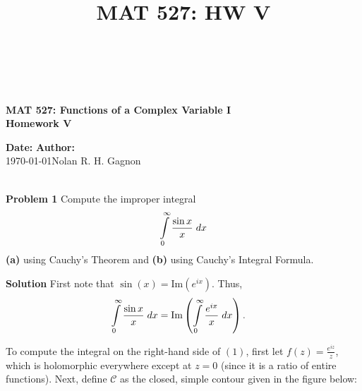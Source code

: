 \documentclass{article}
\title{MAT 527: HW V}
\newcommand{\mybox}{%
    \collectbox{%
        \setlength{\fboxsep}{1pt}%
        \fbox{\BOXCONTENT}%
    }%
}
\begin{document}
\begin{center}
\hrulefill \\
\vspace{-0.7cm}
\hrulefill \\
\vspace{-0.3cm}

\begin{Large}
\textbf{MAT 527:  Functions of a Complex Variable I} \\
\textbf{Homework V} \\
\end{Large}
\begin{large}
\end{large}
\vspace{-7mm}
\noindent \textbf{Date:} \hfill \textbf{Author:}\\
\noindent\today \hfill Nolan R. H. Gagnon \\

\vspace{-0.4cm}
\hrulefill \\
\vspace{-0.7cm}
\hrulefill
\end{center}

\vspace{7mm}

\noindent\mybox{\textbf{Problem 1}}  Compute the improper integral $$\int\limits_0^{\infty}\frac{\sin x}{x} \hspace{1mm} dx$$ \textbf{(a)} using Cauchy's Theorem and \textbf{(b)} using Cauchy's Integral Formula.

\vspace{5mm}

\noindent\mybox{\textbf{Solution}}  First note that $\sin(x) = \text{Im}\left(e^{ix}\right)$.  Thus, 
\begin{align}
\int\limits_0^{\infty}\frac{\sin x}{x} \hspace{1mm} dx &= \text{Im}\left(\int\limits_0^{\infty}\frac{e^{ix}}{x} \hspace{1mm} dx\right).
\end{align}

\noindent To compute the integral on the right-hand side of $(1)$, first let $f(z) = \frac{e^{iz}}{z}$, which is holomorphic everywhere except at $z=0$ (since it is a ratio of entire functions).  Next, define $\mathscr{C}$ as the closed, simple contour given in the figure below: 

\vspace{7mm}
\end{document}
